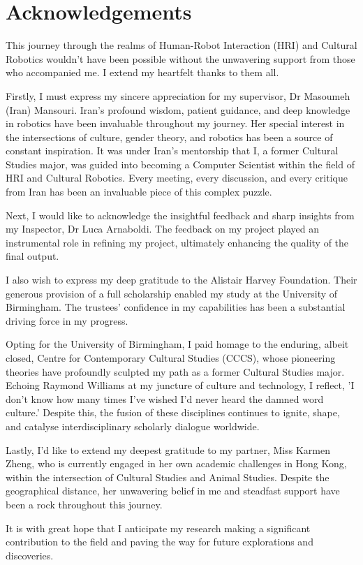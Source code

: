 
\chapter*{Acknowledgements}

This journey through the realms of Human-Robot Interaction (HRI) and Cultural Robotics wouldn't have been possible without the unwavering support from those who accompanied me. I extend my heartfelt thanks to them all.

Firstly, I must express my sincere appreciation for my supervisor, Dr Masoumeh (Iran) Mansouri. Iran's profound wisdom, patient guidance, and deep knowledge in robotics have been invaluable throughout my journey. Her special interest in the intersections of culture, gender theory, and robotics has been a source of constant inspiration. It was under Iran’s mentorship that I, a former Cultural Studies major, was guided into becoming a Computer Scientist within the field of HRI and Cultural Robotics. Every meeting, every discussion, and every critique from Iran has been an invaluable piece of this complex puzzle.

Next, I would like to acknowledge the insightful feedback and sharp insights from my Inspector, Dr Luca Arnaboldi. The feedback on my project played an instrumental role in refining my project, ultimately enhancing the quality of the final output. 

I also wish to express my deep gratitude to the Alistair Harvey Foundation. Their generous provision of a full scholarship enabled my study at the University of Birmingham. The trustees' confidence in my capabilities has been a substantial driving force in my progress.

Opting for the University of Birmingham, I paid homage to the enduring, albeit closed, Centre for Contemporary Cultural Studies (CCCS), whose pioneering theories have profoundly sculpted my path as a former Cultural Studies major. Echoing Raymond Williams \cite{williams1981} at my juncture of culture and technology, I reflect, 'I don't know how many times I've wished I'd never heard the damned word culture.' Despite this, the fusion of these disciplines continues to ignite, shape, and catalyse interdisciplinary scholarly dialogue worldwide.

Lastly, I'd like to extend my deepest gratitude to my partner, Miss Karmen Zheng, who is currently engaged in her own academic challenges in Hong Kong, within the intersection of Cultural Studies and Animal Studies. Despite the geographical distance, her unwavering belief in me and steadfast support have been a rock throughout this journey.

It is with great hope that I anticipate my research making a significant contribution to the field and paving the way for future explorations and discoveries.

